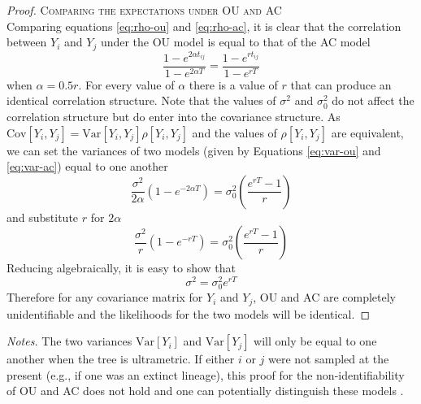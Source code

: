 \documentclass[12pt,twoside]{article}
\newcommand{\Var}{\mathrm{Var}}
\newcommand{\Cov}{\mathrm{Cov}}
\begin{document}
\begin{proof}
\par{\textsc{Comparing the expectations under OU and AC}}\\
Comparing equations \ref{eq:rho-ou} and \ref{eq:rho-ac}, it is clear that the correlation between $Y_i$ and $Y_j$ under the OU model is equal to that of the AC model
\begin{equation}
\frac{1-e^{2\alpha t_{ij}}}
{1-e^{2\alpha T}} = \frac{1-e^{r t_{ij}}}{1-e^{r T}}
\end{equation}
when $\alpha = \text{0.5}r$. For every value of $\alpha$ there is a value of $r$ that can produce an identical correlation structure. Note that the values of $\sigma^2$ and $\sigma^2_0$ do not affect the correlation structure but do enter into the covariance structure. As $\Cov[Y_i, Y_j] = \Var[Y_i, Y_j]\rho[Y_i, Y_j]$ and the values of $\rho[Y_i, Y_j]$ are equivalent, we can set the variances of two models (given by Equations \ref{eq:var-ou} and \ref{eq:var-ac}) equal to one another
\begin{equation}\label{eq:var}
\frac{\sigma^2}{2\alpha}(1 - e^{-2\alpha T}) = \sigma^2_0 \left(\frac{e^{rT} - 1}{r} \right)
\end{equation}
and substitute $r$ for $2\alpha$
\[\frac{\sigma^2}{r}(1 - e^{-r T}) = \sigma^2_0 \left(\frac{e^{r T} - 1}{r} \right)\]
Reducing algebraically, it is easy to show that
\begin{equation}
\sigma^2 = \sigma^2_0 e^{rT}
\end{equation}
Therefore for any covariance matrix for $Y_i$ and $Y_j$, OU and AC are completely unidentifiable and the likelihoods for the two models will be identical.

\end{proof}

\noindent \emph{Notes.} The two variances $\Var[Y_i]$ and $\Var[Y_j]$ will only be equal to one another when the tree is ultrametric. If either $i$ or $j$ were not sampled at the present (e.g., if one was an extinct lineage), this proof for the non-identifiability of OU and AC does not hold and one can potentially distinguish these models \citep{SlaterFossil}.


\renewcommand\thefigure{S.\arabic{figure}}
\renewcommand\thetable{S.\arabic{table}}
\clearpage
\listoffigures
\end{document}
